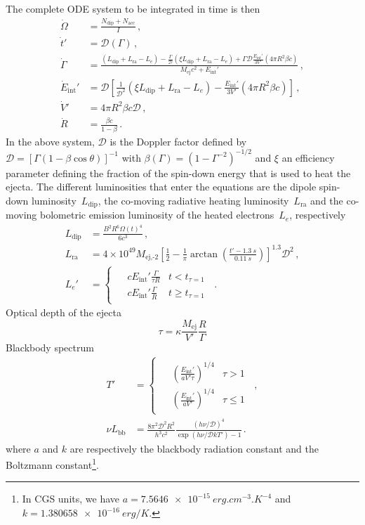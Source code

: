 \documentclass[11pt]{article} %
\newcommand{\tx}[1]{\textrm{#1}}
\newcommand{\Doppler}{\ensuremath{\mathcal{D}}}
\newcommand{\Ndip}{\ensuremath{N_\tx{dip}}}
\newcommand{\Nacc}{\ensuremath{N_\tx{acc}}}
\newcommand{\Ldip}{\ensuremath{L_\tx{dip}}}
\newcommand{\Lrad}{\ensuremath{L_\tx{ra}}}
\newcommand{\Lelec}{\ensuremath{L_e}}
\newcommand{\Lbb}{\ensuremath{L_\tx{bb}}}
\newcommand{\Eint}{\ensuremath{E_\tx{int}}}
\begin{document}
The complete ODE system to be integrated in time is then
\citep{sun2017}
\begin{align}
 \dot{\Omega} &= \frac{\Ndip + \Nacc}{I} \,,\\
 \dot{t}'     &= \Doppler(\Gamma) \,,\\
 \dot{\Gamma} &= \frac{(\Ldip + \Lrad - \Lelec)-
   \tfrac{\Gamma}{\Doppler}(\xi \Ldip + \Lrad - \Lelec)+
   \Gamma\Doppler\tfrac{\Eint'}{3V'}(4\pi R^2\beta c)}
     {M_\tx{ej}c^2+ \Eint'} \,,\\
 \dot{E}_\tx{int}' &= \Doppler\left[\tfrac{1}{\Doppler^2}(\xi \Ldip + \Lrad - \Lelec)-
   \tfrac{\Eint'}{3V'}(4\pi R^2\beta c)\right] \,,\\
\dot{V}' &= 4\pi R^2\beta c \Doppler \,,\\
\dot{R} &= \frac{\beta c}{1-\beta}
\,.
\end{align}
In the above system, \Doppler{} is the Doppler factor defined by
$\Doppler = [\Gamma(1-\beta\cos\theta)]^{-1}$ with $ \beta(\Gamma) =
(1-\Gamma^{-2})^{-1/2}$ and $\xi$ an efficiency parameter defining the
fraction of the spin-down energy that is used to heat the ejecta. The
different luminosities that enter the equations are the dipole
spin-down luminosity~\Ldip{}, the co-moving radiative heating
luminosity~\Lrad{} and the co-moving bolometric emission luminosity of
the heated electrons~\Lelec{}, respectively
\begin{align}
  \Ldip &= \frac{B^2 R^6 \Omega(t)^4}{6c^3} \,,\\
  \Lrad &=  4 \times 10^{49} M_\tx{ej,-2}
  \left[\frac{1}{2}-\frac{1}{\pi} \arctan
    \left(\frac{t'-\SI{1.3}{s}}{\SI{0.11}{s}}\right)
    \right]^{1.3} \Doppler^2 \,,\\
  \Lelec' &=
  \begin{cases}
    \begin{aligned}
    & c\Eint' \tfrac{\Gamma}{\tau R} &t < t_{\tau=1} \\[1ex]
    & c\Eint' \tfrac{\Gamma}{R} &t \geq t_{\tau=1}
    \end{aligned}
  \end{cases}
  \,.
\end{align}
Optical depth of the ejecta
\begin{equation}
  \tau = \kappa \frac{M_\tx{ej}}{V'}\frac{R}{\Gamma}
\end{equation}
Blackbody spectrum
\begin{align}
T' &=
\begin{cases}
  \begin{aligned}
    &\left(\frac{\Eint'}{a V' \tau}\right)^{1/4} & \tau > 1 \\
    &\left(\frac{\Eint'}{a V'}\right)^{1/4} & \tau \leq 1
  \end{aligned}
\end{cases} \,,\\
\nu \Lbb &= \frac{8 \pi^2 \Doppler^2 R^2}{h^3 c^2}
\frac{(h \nu/\Doppler)^4}{\exp\left(h\nu/\Doppler kT'\right)-1}
\,.
\end{align}
where $a$ and $k$ are respectively the blackbody radiation constant
and the Boltzmann constant\footnote{In CGS units, we have
  $a=\SI{7.5646e-15}{erg.cm^{-3}.K^{-4}}$ and
  $k=\SI{1.380658e-16}{erg/K}$.}.
\end{document}
